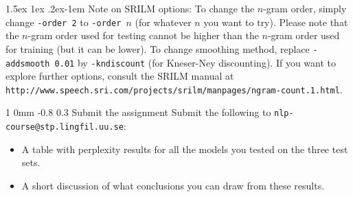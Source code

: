 \documentclass[11pt]{article}
\makeatletter
\newcommand{\newsec}[2]{\section{#1}\label{sec:#2}\noindent}
\renewcommand{\section}{\@startsection
{section}%
{1}%
{0mm}%
{-0.8\baselineskip}%
{0.3\baselineskip}%
{\bfseries\large}}%
\renewcommand{\paragraph}{%
  \@startsection{paragraph}{4}%
  {\z@}{1.5ex \@plus 1ex \@minus .2ex}{-1em}%
  {\normalfont\normalsize\bfseries}%
}\makeatother
\makeatother
\begin{document}
\paragraph{Note on SRILM options:} To change the $n$-gram order, simply change {\tt -order\,2} to {\tt -order\,$n$} (for whatever $n$ you want to try).
Please note that the $n$-gram order used for testing cannot be higher than the $n$-gram order used for training (but it can be lower). To change
smoothing method, replace {\tt -addsmooth\,0.01} by {\tt -kndiscount} (for Kneser-Ney discounting). If you want to explore further options, consult the
SRILM manual at {\small 
{\tt http://www.speech.sri.com/projects/srilm/manpages/ngram-count.1.html}}. 

\newsec{Submit the assignment}{submit}%
Submit the following to {\tt nlp-course@stp.lingfil.uu.se}: 
\begin{itemize}[noitemsep,topsep=0.2cm]
\item A table with perplexity results for all the models you tested on the three test sets.
\item A short discussion of what conclusions you can draw from these results.
\end{itemize}
\end{document}
